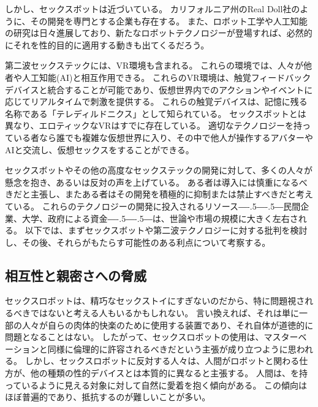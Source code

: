 \documentclass[paper=a4,book,openany]{jlreq}
\def\DDASH{―\kern-.5\zw―\kern-.5\zw―} %
\begin{document}
しかし、セックスボットは近づいている。
カリフォルニア州のReal Doll社のように、その開発を専門とする企業も存在する。
また、ロボット工学や人工知能の研究は日々進展しており、新たなロボットテクノロジーが登場すれば、必然的にそれを性的目的に適用する動きも出てくるだろう。

第二波セックステックには、VR環境も含まれる。
これらの環境では、人々が他者や人工知能(AI)と相互作用できる。
これらのVR環境は、触覚フィードバックデバイスと統合することが可能であり、仮想世界内でのアクションやイベントに応じてリアルタイムで刺激を提供する。
これらの触覚デバイスは、記憶に残る名称である「テレディルドニクス」として知られている。
セックスボットとは異なり、エロティックなVRはすでに存在している。
適切なテクノロジーを持っている者なら誰でも複雑な仮想世界に入り、その中で他人が操作するアバターやAIと交流し、仮想セックスをすることができる。

セックスボットやその他の高度なセックステックの開発に対して、多くの人々が懸念を抱き、あるいは反対の声を上げている。
ある者は導入には慎重になるべきだと主張し、またある者はその開発を積極的に抑制または禁止すべきだと考えている。
これらのテクノロジーの開発に投入されるリソース{\DDASH}民間企業、大学、政府による資金{\DDASH}は、世論や市場の規模に大きく左右される。
以下では、まずセックスボットや第二波テクノロジーに対する批判を検討し、その後、それらがもたらす可能性のある利点について考察する。

\subsection{相互性と親密さへの脅威}

セックスロボットは、精巧なセックストイにすぎないのだから、特に問題視されるべきではないと考える人もいるかもしれない。
言い換えれば、それは単に一部の人々が自らの肉体的快楽のために使用する装置であり、それ自体が道徳的に問題となることはない。
したがって、セックスロボットの使用は、マスターベーションと同様に倫理的に許容されるべきだという主張が成り立つように思われる。
しかし、セックスロボットに反対する人々は、人間がロボットと関わる仕方が、他の種類の性的デバイスとは本質的に異なると主張する。
人間は、を持っているように見える対象に対して自然に愛着を抱く傾向がある。
この傾向はほぼ普遍的であり、抵抗するのが難しいことが多い。
\end{document}
